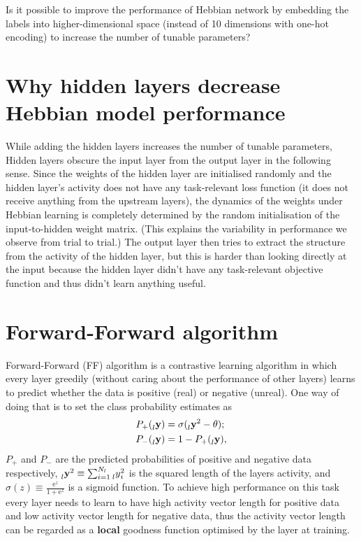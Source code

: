 \documentclass[a4paper, 11pt]{article}
\begin{document}
\begin{tcolorbox}[myquestionbox]
Is it possible to improve the performance of Hebbian network by embedding the labels into higher-dimensional space (instead of 10 dimensions with one-hot encoding) to increase the number of tunable parameters?
\end{tcolorbox}

\section{Why hidden layers decrease Hebbian model performance}

While adding the hidden layers increases the number of tunable parameters, Hidden layers obscure the input layer from the output layer in the following sense. Since the weights of the hidden layer are initialised randomly and the hidden layer's activity does not have any task-relevant loss function (it does not receive anything from the upstream layers), the dynamics of the weights under Hebbian learning is completely determined by the random initialisation of the input-to-hidden weight matrix. (This explains the variability in performance we observe from trial to trial.) The output layer then tries to extract the structure from the activity of the hidden layer, but this is harder than looking directly at the input because the hidden layer didn't have any task-relevant objective function and thus didn't learn anything useful.

\section{Forward-Forward algorithm}
Forward-Forward (FF) algorithm is a contrastive learning algorithm in which every layer greedily (without caring about the performance of other layers) learns to predict whether the data is positive (real) or negative (unreal). One way of doing that is to set the class probability estimates as
\begin{align*}
  P_+(\prescript{}{l}{\mathbf y}) &= \sigma(\prescript{}{l}{\mathbf y}^2-\theta); \\
  P_-(\prescript{}{l}{\mathbf y}) &= 1-P_+(\prescript{}{l}{\mathbf y}),
\end{align*}
$P_+$ and $P_-$ are the predicted probabilities of positive and negative data respectively, $\prescript{}{l}{\mathbf y}^2 \equiv \sum_{i=1}^{N_l}\prescript{}{l}{y}_i^2$ is the squared length of the layers activity, and $\sigma(z) \equiv \frac{\mathrm e^z}{1+\mathrm e^z}$ is a sigmoid function. To achieve high performance on this task every layer needs to learn to have high activity vector length for positive data and low activity vector length for negative data, thus the activity vector length can be regarded as a {\bf local} goodness function optimised by the layer at training.
\end{document}
